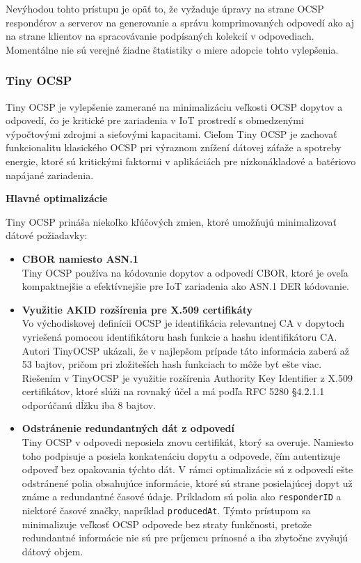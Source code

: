 \documentclass[12pt, twoside]{book}
\newcommand{\subsubsubsection}[1]{%
  \vspace{0.2em}  
  \textbf{#1} \\[0.2em]
  \hspace*{\parindent}
}
\begin{document}
Nevýhodou tohto prístupu je opäť to, že vyžaduje úpravy na strane OCSP respondérov a serverov na generovanie a správu komprimovaných odpovedí ako aj na strane klientov na spracovávanie podpísaných kolekcií v odpovediach. Momentálne nie sú verejné žiadne štatistiky o miere adopcie tohto vylepšenia.

\subsubsection{Tiny OCSP}
Tiny OCSP je vylepšenie zamerané na minimalizáciu veľkosti OCSP dopytov a odpovedí, čo je kritické pre zariadenia v IoT prostredí s obmedzenými výpočtovými zdrojmi a sieťovými kapacitami. Cieľom Tiny OCSP je zachovať funkcionalitu klasického OCSP pri výraznom znížení dátovej záťaže a spotreby energie, ktoré sú kritickými faktormi v aplikáciách pre nízkonákladové a batériovo napájané zariadenia.

\subsubsubsection{Hlavné optimalizácie}
Tiny OCSP prináša niekoľko kľúčových zmien, ktoré umožňujú minimalizovať dátové požiadavky:

\begin{itemize}
\item \textbf{CBOR namiesto ASN.1}\\
Tiny OCSP používa na kódovanie dopytov a odpovedí CBOR, ktoré je oveľa kompaktnejšie a efektívnejšie pre IoT zariadenia ako ASN.1 DER kódovanie.

\item \textbf{Využitie AKID rozšírenia pre X.509 certifikáty}\\
Vo východiskovej definícii OCSP je identifikácia relevantnej CA v dopytoch vyriešená pomocou identifikátoru hash funkcie a hashu identifikátoru CA. Autori TinyOCSP ukázali, že v najlepšom prípade táto informácia zaberá až 53 bajtov, pričom pri zložiteších hash funkciach to môže byť ešte viac. Riešením v TinyOCSP je využitie rozšírenia Authority Key Identifier z X.509 certifikátov, ktoré slúži na rovnaký účel a má podľa RFC 5280 §4.2.1.1 odporúčanú dĺžku iba 8 bajtov.

\item \textbf{Odstránenie redundantných dát z odpovedí}\\
Tiny OCSP v odpovedi neposiela znovu certifikát, ktorý sa overuje. Namiesto toho podpisuje a posiela konkatenáciu dopytu a odpovede, čím autentizuje odpoveď bez opakovania týchto dát. V rámci optimalizácie sú z odpovedí ešte odstránené polia  obsahujúce informácie, ktoré sú strane posielajúcej dopyt už známe a redundantné časové údaje. Príkladom sú polia ako \texttt{responderID} a niektoré časové značky, napríklad \texttt{producedAt}. Týmto prístupom sa minimalizuje veľkosť OCSP odpovede bez straty funkčnosti, pretože redundantné informácie nie sú pre príjemcu prínosné a iba zbytočne zvyšujú dátový objem.

\end{itemize}
\end{document}
